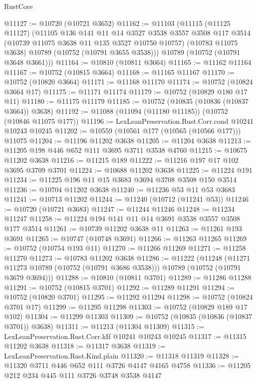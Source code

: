 \begin{lexlean}{RustCore}
\begin{coremodule}
@11127 := @10720 (@10721 @3652)
@11162 := @11103
    (@11115
      (@11125 @11127)
      (@11105
        @136
        @141
        @11
        @14
        @3527
        @3538
        @3557
        @3508
        @117
        @3514
        (@10739 @11075 @3638 @11 @135 @3527 @10750 @10757)
        (@10783 @11075 @3638)
        @10789
        (@10752 (@10791 @3655 @3538)))
      @10789
      (@10752 (@10791 @3648 @3661)))
@11164 := @10810 (@10811 @3664)
@11165 := @11162 @11164
@11167 := @10752 (@10815 @3664)
@11168 := @11165 @11167
@11170 := @10752 (@10820 @3664)
@11171 := @11168 @11170
@11174 := @10752 (@10824 @3664 @17)
@11175 := @11171 @11174
@11179 := @10752 (@10829 @180 @17 @11)
@11180 := @11175 @11179
@11185 := @10752 (@10835 (@10836 (@10837 @3664)) @3638)
@11192 := @11088 (@11094 (@11180 @11185)) (@10752 (@10846 @11075 @177))
@11196 := LexLeanPreservation.Rust.Corr.cond @10241 @10243 @10245
@11202 := @10559 (@10561 @177 (@10565 (@10566 @177))) @11075
@11204 := @11196 @11202 @3638
@11205 := @11204 @3638
@11213 := @11205 @198 @446 @652 @111 @3695 @3711 @3538 @4760
@11215 := @10675 @11202 @3638
@11216 := @11215 @189
@11222 := @11216 @197 @17 @102 @3695 @3709 @3701
@11224 := @10688 @11202 @3638
@11225 := @11224 @191
@11234 := @11225 @196 @11 @15 @3683 @3694 @3708 @3508 @150 @3514
@11236 := @10704 @11202 @3638
@11240 := @11236 @53 @11 @53 @3683
@11241 := @10713 @11202
@11244 := @11240 (@10712 (@11241 @53))
@11246 := @10720 (@10721 @3683)
@11247 := @11244 @11246
@11248 := @11234 @11247
@11258 := @11224 @194 @141 @11 @14 @3691 @3538 @3557 @3508 @177 @3514
@11261 := @10739 @11202 @3638 @11
@11263 := @11261 @193 @3691
@11265 := @10747 (@10748 @3691)
@11266 := @11263 @11265
@11269 := @10752 (@10754 @193 @11)
@11270 := @11266 @11269
@11271 := @11258 @11270
@11273 := @10783 @11202 @3638
@11286 := @11222
    (@11248
      (@11271 @11273 @10789 (@10752 (@10791 @3686 @3538)))
      @10789
      (@10752 (@10791 @3679 @3694)))
@11288 := @10810 (@10811 @3701)
@11289 := @11286 @11288
@11291 := @10752 (@10815 @3701)
@11292 := @11289 @11291
@11294 := @10752 (@10820 @3701)
@11295 := @11292 @11294
@11298 := @10752 (@10824 @3701 @17)
@11299 := @11295 @11298
@11303 := @10752 (@10829 @189 @17 @102)
@11304 := @11299 @11303
@11309 := @10752 (@10835 (@10836 (@10837 @3701)) @3638)
@11311 := @11213 (@11304 @11309)
@11315 := LexLeanPreservation.Rust.Corr.kIf @10241 @10243 @10245
@11317 := @11315 @11202 @3638
@11318 := @11317 @3638
@11319 := LexLeanPreservation.Rust.Kind.plain
@11320 := @11318 @11319
@11328 := @11320 @3711 @446 @652 @111 @3726 @4147 @4165 @4758
@11336 := @11205 @212 @234 @445 @111 @3726 @3748 @3538 @4147

\end{coremodule}
\end{lexlean}
